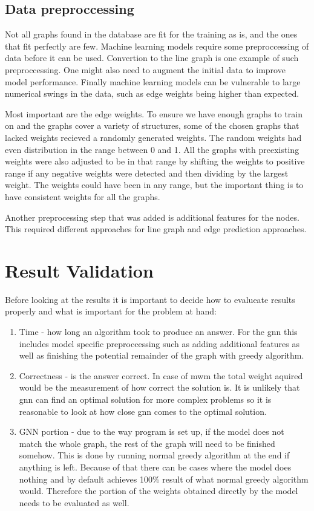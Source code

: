 \subsection{Data preproccessing}

Not all graphs found in the database are fit for the training as is, and the ones that fit perfectly are few. Machine learning models require some preproccessing of data before it can be used. Convertion to the line graph is one example of such preproccessing. One might also need to augment the initial data to improve model performance. Finally machine learning models can be vulnerable to large numerical swings in the data, such as edge weights being higher than expected.

Most important are the edge weights. To ensure we have enough graphs to train on and the graphs cover a variety of structures, some of the chosen graphs that lacked weights recieved a randomly generated weights. The random weights had even distribution in the range between 0 and 1. All the graphs with preexisting weights were also adjusted to be in that range by shifting the weights to positive range if any negative weights were detected and then dividing by the largest weight. The weights could have been in any range, but the important thing is to have consistent weights for all the graphs. 

Another preprocessing step that was added is additional features for the nodes. This required different approaches for line graph and edge prediction approaches.

\section{Result Validation}

Before looking at the results it is important to decide how to evalueate results properly and what is important for the problem at hand:

\begin{enumerate}
\item Time - how long an algorithm took to produce an answer. For the \gls{gnn} this includes model specific preproccessing such as adding additional features as well as finishing the potential remainder of the graph with greedy algorithm.
\item Correctness - is the answer correct. In case of \gls{mwm} the total weight aquired would be the measurement of how correct the solution is. It is unlikely that \gls{gnn} can find an optimal solution for more complex problems so it is reasonable to look at how close \gls{gnn} comes to the optimal solution.
\item GNN portion - due to the way program is set up, if the model does not match the whole graph, the rest of the graph will need to be finished somehow. This is done by running normal greedy algorithm at the end if anything is left. Because of that there can be cases where the model does nothing and by default achieves 100\% result of what normal greedy algorithm would. Therefore the portion of the weights obtained directly by the model needs to be evaluated as well.
\end{enumerate}


